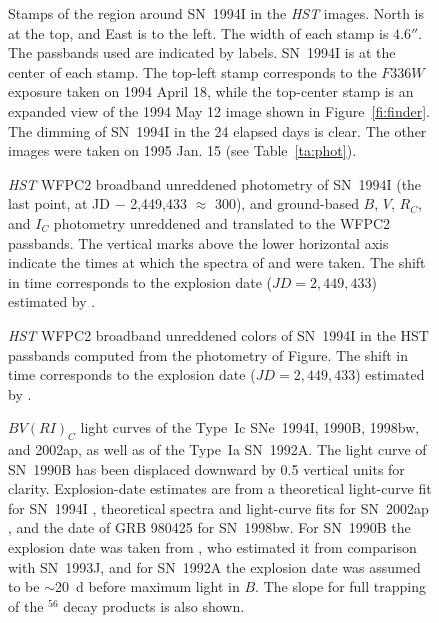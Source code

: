 \documentclass[12pt,manuscript]{aastex}
\begin{document}
\clearpage

\begin{figure}
\caption{\label{fi:stamps}
Stamps of the region around SN~1994I in the {\em HST} images.
North is at the top, and East is to the left. The width of each 
stamp is $4.6''$.
%
The passbands used are indicated by labels. SN~1994I is at the 
center of each stamp.
The top-left stamp corresponds to the $F336W$ exposure taken on 
1994 April 18, while the top-center stamp is an expanded view 
of the 1994 May 12 image shown in Figure~\ref{fi:finder}. The 
dimming of SN~1994I in the 24 elapsed days is clear.
%
The other images were taken on 1995 Jan. 15 
(see Table~\ref{ta:phot}).
}
\end{figure}

\clearpage

\begin{figure}
\caption{\label{fi:phot}
{\em HST} WFPC2 broadband unreddened photometry of SN~1994I 
(the last point, at JD $-$ 2,449,433 $\approx$ 300),
and ground-based $B$, $V$, $R_C$, and $I_C$ photometry 
\citep{retal96} unreddened and translated to the WFPC2 
passbands.
%
The vertical marks above the lower horizontal axis indicate
the times at which the spectra of \citet{fetal95} and
\citet{cetal96b} were taken.
%
The shift in time corresponds to the explosion date ($JD = 
2,449,433$) estimated by \citet{ietal94}.
}
\end{figure}

\clearpage

\begin{figure}
\caption{\label{fi:colors}
{\em HST} WFPC2 broadband unreddened colors of SN~1994I 
in the HST passbands
computed from the photometry of Figure{\protect{\ref{fi:phot}}}.
%
The shift in time corresponds to the explosion date ($JD = 
2,449,433$) estimated by \citet{ietal94}.
}
\end{figure}

\clearpage

\begin{figure}
\caption{ \label{fi:BVRI_1}
$BV(RI)_C$ light curves of the Type~Ic SNe~1994I, 1990B, 
1998bw, and 2002ap, as well as of the Type~Ia SN~1992A.
%
The light curve of SN~1990B has been displaced downward by
0.5 vertical units for clarity.
%
Explosion-date estimates are from a theoretical light-curve 
fit for SN~1994I \citep{ietal94}, theoretical spectra and 
light-curve fits for SN~2002ap \citep{metal02}, and the date 
of GRB 980425 for SN~1998bw.
%
For SN~1990B the explosion date was taken from \citet{cetal01}, 
who estimated it from comparison with SN~1993J, and for 
SN~1992A the explosion date was assumed to be $\sim$20~d before 
maximum light in $B$.
%
The slope for full trapping of the $^{56}$ decay 
products is also shown.
}
\end{figure}
\end{document}
